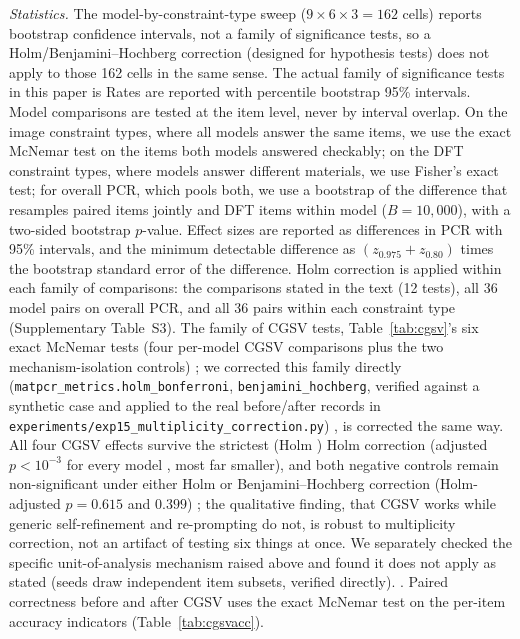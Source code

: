 \documentclass[pdflatex,sn-nature]{sn-jnl}
\newcommand{\rev}[1]{#1} %
\newcommand{\rev}[1]{{\color{blue}#1}} %
\providecommand{\DIFadd}[1]{{\protect\color{blue} \sf #1}} %
\providecommand{\DIFdel}[1]{{\protect\color{red} \scriptsize #1}} %
\providecommand{\DIFaddbegin}{} %
\providecommand{\DIFaddend}{} %
\providecommand{\DIFdelbegin}{} %
\providecommand{\DIFdelend}{} %
\providecommand{\DIFscaledelfig}{0.5}
\newlength{\DIFdelgraphicswidth} %
\newlength{\DIFdelgraphicsheight} %
\providecommand{\DIFaddincludegraphics}[2][]{{\color{blue}\fbox{\DIFOincludegraphics[#1]{#2}}}} %
\providecommand{\DIFdelincludegraphics}[2][]{%
\sbox{\DIFdelgraphicsbox}{\DIFOincludegraphics[#1]{#2}}%
\settoboxwidth{\DIFdelgraphicswidth}{\DIFdelgraphicsbox} %
\settoboxtotalheight{\DIFdelgraphicsheight}{\DIFdelgraphicsbox} %
\scalebox{\DIFscaledelfig}{%
\parbox[b]{\DIFdelgraphicswidth}{\usebox{\DIFdelgraphicsbox}\\[-\baselineskip] \rule{\DIFdelgraphicswidth}{0em}}\llap{\resizebox{\DIFdelgraphicswidth}{\DIFdelgraphicsheight}{%
\setlength{\unitlength}{\DIFdelgraphicswidth}%
\begin{picture}(1,1)%
\thicklines\linethickness{2pt} %
{\color[rgb]{1,0,0}\put(0,0){\framebox(1,1){}}}%
{\color[rgb]{1,0,0}\put(0,0){\line( 1,1){1}}}%
{\color[rgb]{1,0,0}\put(0,1){\line(1,-1){1}}}%
\end{picture}%
}\hspace*{3pt}}} %
} %
\DeclareRobustCommand{\DIFaddbegin}{\DIFOaddbegin \let\includegraphics\DIFaddincludegraphics} %
\DeclareRobustCommand{\DIFaddend}{\DIFOaddend \let\includegraphics\DIFOincludegraphics} %
\DeclareRobustCommand{\DIFdelbegin}{\DIFOdelbegin \let\includegraphics\DIFdelincludegraphics} %
\DeclareRobustCommand{\DIFdelend}{\DIFOaddend \let\includegraphics\DIFOincludegraphics} %
\begin{document}
\noindent\emph{Statistics.} \DIFdelbegin \DIFdel{The model-by-constraint-type sweep ($9\times6\times3=162$ cells)
reports bootstrap confidence intervals, not a family of significance tests, so a
Holm/Benjamini--Hochberg correction (designed for hypothesis tests) does not apply to those
162 cells in the same sense. The actual family of significance tests in this paper is
}\DIFdelend \DIFaddbegin \DIFadd{\rev{Rates are reported with percentile bootstrap 95\% intervals. Model
comparisons are tested at the item level, never by interval overlap. On the image constraint types,
where all models answer the same items, we use the exact McNemar test on the items both models
answered checkably; on the DFT constraint types, where models answer different materials, we use
Fisher's exact test; for overall PCR, which pools both, we use a bootstrap of the difference that
resamples paired items jointly and DFT items within model ($B=10{,}000$), with a two-sided bootstrap
$p$-value. Effect sizes are reported as differences in PCR with 95\% intervals, and the minimum
detectable difference as $(z_{0.975}+z_{0.80})$ times the bootstrap standard error of the
difference. Holm correction is applied within each family of comparisons: the comparisons stated in
the text (12 tests), all 36 model pairs on overall PCR, and all 36 pairs within each constraint type
(Supplementary Table~S3).} The family of CGSV tests, }\DIFaddend Table~\ref{tab:cgsv}'s six exact McNemar tests (four per-model CGSV comparisons plus the two
mechanism-isolation controls)\DIFdelbegin \DIFdel{; we corrected this family directly
(\texttt{matpcr\_metrics.holm\_bonferroni}, \texttt{benjamini\_hochberg}, verified against a
synthetic case and applied to the real before/after records in
\texttt{experiments/exp15\_multiplicity\_correction.py})}\DIFdelend \DIFaddbegin \DIFadd{, \rev{is corrected the same way}}\DIFaddend . All four CGSV effects survive
\DIFdelbegin \DIFdel{the
strictest (Holm ) }\DIFdelend \DIFaddbegin \DIFadd{Holm }\DIFaddend correction (adjusted $p<10^{-3}$ for every model\DIFdelbegin \DIFdel{, most far smaller}\DIFdelend ), and
both \DIFdelbegin \DIFdel{negative }\DIFdelend controls remain non-significant under \DIFdelbegin \DIFdel{either }\DIFdelend \DIFaddbegin \DIFadd{\rev{Holm or Benjamini--Hochberg} }\DIFaddend correction (Holm-adjusted
$p=0.615$ and $0.399$)\DIFdelbegin \DIFdel{; the qualitative finding, that CGSV works while generic
self-refinement and re-prompting do not, is robust to multiplicity correction, not an
artifact of testing six things at once. We separately checked the specific unit-of-analysis
mechanism raised above and found it does not apply as stated (seeds draw independent item
subsets, verified directly).
}\DIFdelend \DIFaddbegin \DIFadd{. \rev{Paired correctness before and after CGSV uses the exact McNemar test on
the per-item accuracy indicators (Table~\ref{tab:cgsvacc}).}
}\DIFaddend 
\end{document}
